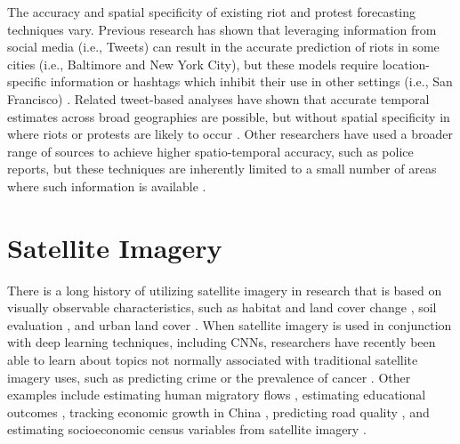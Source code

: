 The accuracy and spatial specificity of existing riot and protest forecasting techniques vary.  Previous research has shown that leveraging information from social media (i.e., Tweets) can result in the accurate prediction of riots in some cities (i.e., Baltimore and New York City), but these models require location-specific information or hashtags which inhibit their use in other settings (i.e., San Francisco) \citep{korolov2016predicting}.  Related tweet-based analyses have shown that accurate temporal estimates across broad geographies are possible, but without spatial specificity in where riots or protests are likely to occur \citep{gonzalez2011dynamics}. Other researchers have used a broader range of sources to achieve higher spatio-temporal accuracy, such as police reports, but these techniques are inherently limited to a small number of areas where such information is available \citep{alsaedi2015identifying,korolov2016predicting,gonzalez2011dynamics,bonnasse2018epidemiological, alsaedi2017can}.

\section{Satellite Imagery}

There is a long history of utilizing satellite imagery in research that is based on visually observable characteristics, such as habitat and land cover change \citep{alo2008identifying,stow2008monitoring,rogan2004remote}, soil evaluation \citep{foody2004toward}, and urban land cover \citep{zhou2008object}.  When satellite imagery is used in conjunction with deep learning techniques, including CNNs, researchers have recently been able to learn about topics not normally associated with traditional satellite imagery uses, such as predicting crime \citep{najjar2018crime} or the prevalence of cancer \citep{bibault2020deep}.  Other examples include estimating human migratory flows \citep{runfola2022deep}, estimating educational outcomes \citep{runfola2022using}, tracking economic growth in China \citep{brewer2023tracking}, predicting road quality \citep{brewer2021predicting}, and estimating socioeconomic census variables from satellite imagery \citep{runfola2024multi}.

